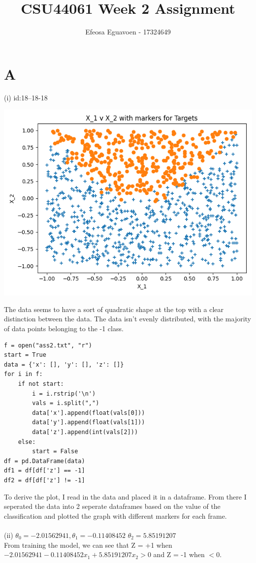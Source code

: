 \documentclass[10pt,a4paper]{article}
\author{Efeosa Eguavoen - 17324649}
\title{CSU44061 Week 2 Assignment}
\begin{document}
\maketitle
\section{A}
(i)
id:18--18-18
\begin{center}
\includegraphics[scale=0.5]{x1vx2.jpg}
\end{center}
The data seems to have a sort of quadratic shape at the top with a clear distinction between the data. The data isn't evenly distributed, with the majority of data points belonging to the -1 class.
\begin{verbatim}
f = open("ass2.txt", "r")
start = True
data = {'x': [], 'y': [], 'z': []}
for i in f:
    if not start:
        i = i.rstrip('\n')
        vals = i.split(",")
        data['x'].append(float(vals[0]))
        data['y'].append(float(vals[1]))
        data['z'].append(int(vals[2]))
    else:
        start = False
df = pd.DataFrame(data)
df1 = df[df['z'] == -1]
df2 = df[df['z'] != -1]
\end{verbatim}
To derive the plot, I read in the data and placed it in a dataframe. From there I seperated the data into 2 seperate dataframes based on the value of the classification and plotted the graph with different markers for each frame. 
\\\\
(ii)
 \(\theta_0 = -2.01562941, \theta_1 =  -0.11408452 \) \(\theta_2 =  5.85191207\)
\\
From training the model, we can see that Z = +1 when \(-2.01562941 -0.11408452x_1 + 5.85191207x_2 > 0\) and Z = -1 when \(< 0\). 
\end{document}
